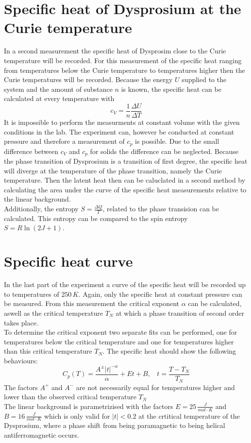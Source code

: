 \documentclass{include/thesisclass3}
\newcommand{\cc}{\cdot}
\newcommand{\e}[1]{\,\si{#1}}
\begin{document}
\section{Specific heat of Dysprosium at the Curie temperature}
In a second measurement the specific heat of Dysprosim close to the Curie temperature will be recorded. 
For this  measurement of the specific heat ranging from temperatures below the Curie temperature to temperatures higher then the Curie temperatures will be recorded. 
Because the energy $U$ supplied to the system and the amount of substance $n$ is known, the specific heat can be calculated at every temperature with
\[
c_V = \frac{1}{n} \frac{\Delta U}{\Delta T}
\]
It is impossible to perform the measurments at constant volume with the given conditions in the lab. The experiment can, however be conducted at constant pressure and therefore a measurement of $c_p$ is possible. Due to the small difference between $c_V$ and $c_p$ for solids the difference can be neglected.
Because the phase transition of Dysprosium is a transition of first degree, the specific heat will diverge at the temperature of the phase transition, namely the Curie temperature.
Then the latent heat then can be caluclated in a second method by calculating the area under the curve of the specific heat measurements relative to the linear background.\\
Additionally, the entropy $S = \frac{\Delta Q}{T}$, related to the phase transision can be calculated.
This entropy can be compared to the spin entropy $S = R \ln (2 J + 1)$.


\section{Specific heat curve}
In the last part of the experiment a curve of the specific heat will be recorded up to temperatures of $250\e{K}$.
Again, only the specific heat at constant pressure can be measured.
From this measurement the critical exponent $\alpha$ can be calculated, aswell as the critical temperature $T_N$ at which a phase transition of second order takes place.\\
To determine the critical exponent two separate fits can be performed, one for temperatures below the critical temperature and one for temperatures higher than this critical temperature $T_N$.
The specific heat should show the following behaviours:
\[ C_p(T) = \frac{ A^\pm |t|^{-\alpha}}{\alpha} + Et + B, ~~~~ t = \frac{T-T_N}{T_N}\]
The factors $A^+$ and $A^-$ are not necessarily equal for temperatures higher and lower than the observed critical temperature $T_N$\\
The linear background is parametrizised with the factors $E = 25 \e{\frac{J}{mol\cc K}}$ and $B = 16\e{\frac{J}{mol \cc K}}$ which is only valid for $|t| < 0.2$ at the crtitical temperature of the Dysprosium, where a phase shift from being paramagnetic to being helical antiferromagnetic occurs.
\end{document}
